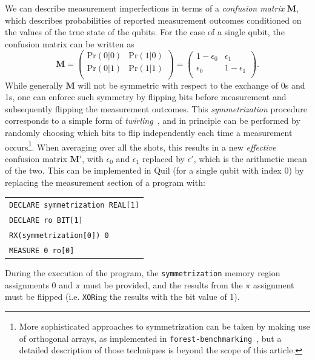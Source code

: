\documentclass[12pt]{iopart}
\begin{document}
We can describe measurement imperfections in terms of a \textit{confusion matrix} 
\textbf{M}, which describes probabilities of reported measurement outcomes 
conditioned on the values of the true state of the qubits. For the case of a single 
qubit, the confusion matrix can be written as
\begin{equation}
\textbf{M} = \begin{pmatrix}
           \text{Pr}(0|0) & \text{Pr}(1|0) \\
            \text{Pr}(0|1) & \text{Pr}(1|1) \\
            \end{pmatrix}
         = \begin{pmatrix}
            1 - \epsilon_0 & \epsilon_1\\
            \epsilon_0 & 1 - \epsilon_1 \\
            \end{pmatrix}.
\end{equation}
While generally $\textbf{M}$ will not be symmetric with respect to the exchange of 0s 
and 1s, one can enforce such symmetry by flipping bits before measurement and 
subsequently flipping the measurement outcomes. This {\em symmetrization} procedure 
corresponds to a simple form of {\em twirling}~\cite{Bennet1996,Bartlett2007}, and in principle can be performed by randomly choosing which bits to 
flip independently each time a measurement occurs\footnote{More sophisticated 
approaches to symmetrization can be taken by making use of orthogonal arrays, as 
implemented in {\tt forest-benchmarking}~\cite{ForestBenchmarking}, but a detailed 
description of those techniques is beyond the scope of this article.}.
When averaging  over all the shots, this results in a new \textit{effective} confusion matrix $\textbf{M}'$, with $\epsilon_0$ and $\epsilon_1$ replaced by $\epsilon'$, 
which is the arithmetic mean of the two. This can be implemented in Quil (for a single qubit with index 0) by replacing the measurement section of a program with:
\begin{center}
\begin{tabular}{l}
\verb|DECLARE symmetrization REAL[1]|\\
\verb|DECLARE ro BIT[1]|\\
\verb|RX(symmetrization[0]) 0|\\
\verb|MEASURE 0 ro[0]|\\
\end{tabular}
\end{center}
During the execution of the program, the \texttt{symmetrization} memory region assignments $0$ and $\pi$ must be provided, and the results from the $\pi$ assignment must be flipped (i.e. \texttt{XOR}ing the results with the bit value of 1).
\end{document}

